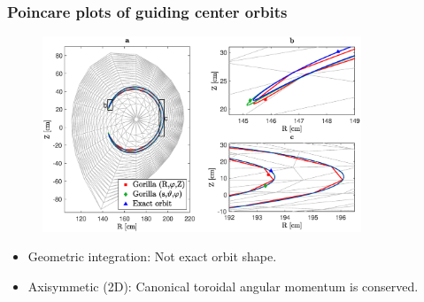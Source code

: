 \documentclass{beamer}
\begin{document}
\begin{frame}
\frametitle{Poincare plots of guiding center orbits}
\vspace{-1.1cm}
\begin{figure}
	\hspace*{-0.9cm}\includegraphics[trim={0cm 0cm 0cm 0cm},clip,width=0.85\textwidth]{FIGURES/orbit_plot.eps}
\end{figure}
\begin{itemize}
	\vspace*{-0.5cm}
\item Geometric integration: Not exact orbit shape.
\item Axisymmetic (2D): Canonical toroidal angular momentum is conserved.
\end{itemize}
\end{frame}


\end{document}
